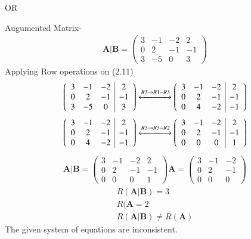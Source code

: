 \documentclass[journal,13pt,twocolumn]{IEEEtran}
\newcommand{\myvec}[1]{\ensuremath{\begin{pmatrix}#1\end{pmatrix}}}
\renewcommand{\vec}[1]{\mathbf{#1}}
\begin{document}
 \begin{center}
 OR
 \end{center}
 Augumented Matrix-
\begin{align}
\vec{A}|\vec{B}=\left(\begin{array}{ccc|c}  
 3 & -1 & -2 & 2\\  
 0 & 2 & -1 & -1\\
 3 & -5 & 0 & 3
\end{array}\right) 
\end{align}
 Applying Row operations on (2.11)\\
\begin{align}
   \left(\begin{array}{ccc|c}  
 3 & -1 & -2 & 2\\  
 0 & 2 & -1 & -1\\
 3 & -5 & 0 & 3
\end{array}\right)\xleftrightarrow[]{R3\rightarrow R1-R3} \left(\begin{array}{ccc|c}  
 3 & -1 & -2 & 2\\  
 0 & 2 & -1 & -1\\
 0 & 4 & -2 & -1
\end{array}\right)
\end{align}
\begin{align}
\left(\begin{array}{ccc|c}  
 3 & -1 & -2 & 2\\  
 0 & 2 & -1 & -1\\
 0 & 4 & -2 & -1
\end{array}\right)\xleftrightarrow[]{R3\rightarrow R3-R2}
\left(\begin{array}{ccc|c}  
 3 & -1 & -2 & 2\\  
 0 & 2 & -1 & -1\\
 0 & 0 & 0 & 1
\end{array}\right)
\end{align}
\begin{align}
\vec{A}|\vec{B}=\left(\begin{array}{ccc|c}  
 3 & -1 & -2 & 2\\  
 0 & 2 & -1 & -1\\
 0 & 0 & 0 & 1
\end{array}\right) 
\vec{A}=\myvec
 {3 & -1 & -2\\  
 0 & 2 & -1\\
 0 & 0 & 0}
\end{align}
\begin{align}
R(\vec{A}|\vec{B}) = 3\\
R(\vec{A} = 2\\
R(\vec{A}|\vec{B}) \neq  R(\vec{A})
\end{align}
The given system of equations are inconsistent.
\end{document}

